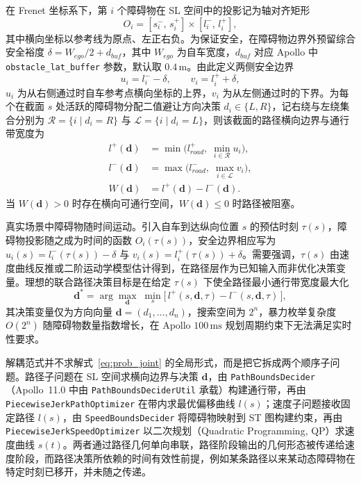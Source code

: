 \documentclass[a4paper,11pt]{ctexart}
\theoremstyle{definition}
\begin{document}
在 Frenet 坐标系下，第 $i$ 个障碍物在 SL 空间中的投影记为轴对齐矩形
\begin{equation}
    O_i = [s_i^{-},\, s_i^{+}] \times [l_i^{-},\, l_i^{+}],
    \label{eq:prob_obs_proj}
\end{equation}
其中横向坐标以参考线为原点、左正右负。为保证安全，在障碍物边界外预留综合安全裕度 $\delta = W_{ego}/2 + d_{buf}$，其中 $W_{ego}$ 为自车宽度，$d_{buf}$ 对应 Apollo 中 \texttt{obstacle\_lat\_buffer} 参数，默认取 $0.4\,\mathrm{m}$。由此定义两侧安全边界
\begin{equation}
    u_i = l_i^{-} - \delta, \qquad v_i = l_i^{+} + \delta,
    \label{eq:prob_uv}
\end{equation}
$u_i$ 为从右侧通过时自车参考点横向坐标的上界，$v_i$ 为从左侧通过时的下界。为每个在截面 $s$ 处活跃的障碍物分配二值避让方向决策 $d_i \in \{L, R\}$，记右绕与左绕集合分别为 $\mathcal{R} = \{i \mid d_i = R\}$ 与 $\mathcal{L} = \{i \mid d_i = L\}$，则该截面的路径横向边界与通行带宽度为
\begin{align}
    l^{+}(\mathbf{d}) &= \min\Big(l_{road}^{+},\; \min_{i \in \mathcal{R}} u_i\Big), \label{eq:prob_upper} \\
    l^{-}(\mathbf{d}) &= \max\Big(l_{road}^{-},\; \max_{i \in \mathcal{L}} v_i\Big), \label{eq:prob_lower} \\
    W(\mathbf{d}) &= l^{+}(\mathbf{d}) - l^{-}(\mathbf{d}). \label{eq:prob_band}
\end{align}
当 $W(\mathbf{d}) > 0$ 时存在横向可通行空间，$W(\mathbf{d}) \le 0$ 时路径被阻塞。

真实场景中障碍物随时间运动。引入自车到达纵向位置 $s$ 的预估时刻 $\tau(s)$，障碍物投影随之成为时间的函数 $O_i(\tau(s))$，安全边界相应写为 $u_i(s) = l_i^{-}(\tau(s)) - \delta$ 与 $v_i(s) = l_i^{+}(\tau(s)) + \delta$。需要强调，$\tau(s)$ 由速度曲线反推或二阶运动学模型估计得到，在路径层作为已知输入而非优化决策变量。理想的联合路径决策目标是在给定 $\tau(s)$ 下使全路径最小通行带宽度最大化
\begin{equation}
    \mathbf{d}^{*} = \arg\max_{\mathbf{d}} \;\min_{s} \big[\,l^{+}(s, \mathbf{d}, \tau) - l^{-}(s, \mathbf{d}, \tau)\,\big],
    \label{eq:prob_joint}
\end{equation}
其决策变量仅为方向向量 $\mathbf{d} = (d_1, \ldots, d_n)$，搜索空间为 $2^n$，暴力枚举复杂度 $O(2^n)$ 随障碍物数量指数增长，在 Apollo $100\,\mathrm{ms}$ 规划周期约束下无法满足实时性要求。

解耦范式并不求解式~\eqref{eq:prob_joint} 的全局形式，而是把它拆成两个顺序子问题。路径子问题在 SL 空间求横向边界与决策 $\mathbf{d}$，由 \texttt{PathBoundsDecider}（Apollo~11.0 中由 \texttt{PathBoundsDeciderUtil} 承载）构建通行带，再由 \texttt{PiecewiseJerkPathOptimizer} 在带内求最优偏移曲线 $l(s)$；速度子问题接收固定路径 $l(s)$，由 \texttt{SpeedBoundsDecider} 将障碍物映射到 ST 图构建约束，再由 \texttt{PiecewiseJerkSpeedOptimizer} 以二次规划（Quadratic Programming, QP）求速度曲线 $s(t)$。两者通过路径几何单向串联，路径阶段输出的几何形态被传递给速度阶段，而路径决策所依赖的时间有效性前提，例如某条路径以来某动态障碍物在特定时刻已移开，并未随之传递。
\end{document}
